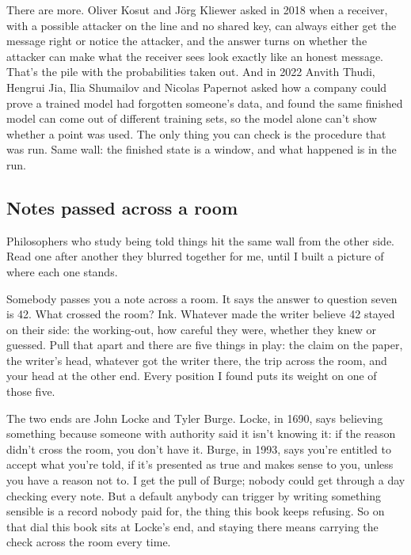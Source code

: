 \documentclass[11pt,twoside]{article}
\theoremstyle{thielethm}
\theoremstyle{thieledef}
\theoremstyle{thieledef}
\theoremstyle{thieledef}
\theoremstyle{thielethm}
\theoremstyle{thieleobs}
\theoremstyle{thielethm}
\begin{document}
There are more. Oliver Kosut and Jörg Kliewer asked in 2018 when a receiver, with a possible attacker on the line and no shared key, can always either get the message right or notice the attacker, and the answer turns on whether the attacker can make what the receiver sees look exactly like an honest message. That's the pile with the probabilities taken out. And in 2022 Anvith Thudi, Hengrui Jia, Ilia Shumailov and Nicolas Papernot asked how a company could prove a trained model had forgotten someone's data, and found the same finished model can come out of different training sets, so the model alone can't show whether a point was used. The only thing you can check is the procedure that was run. Same wall: the finished state is a window, and what happened is in the run.

\subsection{Notes passed across a room}

Philosophers who study being told things hit the same wall from the other side. Read one after another they blurred together for me, until I built a picture of where each one stands.

Somebody passes you a note across a room. It says the answer to question seven is 42. What crossed the room? Ink. Whatever made the writer believe 42 stayed on their side: the working-out, how careful they were, whether they knew or guessed. Pull that apart and there are five things in play: the claim on the paper, the writer's head, whatever got the writer there, the trip across the room, and your head at the other end. Every position I found puts its weight on one of those five.

The two ends are John Locke and Tyler Burge. Locke, in 1690, says believing something because someone with authority said it isn't knowing it: if the reason didn't cross the room, you don't have it. Burge, in 1993, says you're entitled to accept what you're told, if it's presented as true and makes sense to you, unless you have a reason not to. I get the pull of Burge; nobody could get through a day checking every note. But a default anybody can trigger by writing something sensible is a record nobody paid for, the thing this book keeps refusing. So on that dial this book sits at Locke's end, and staying there means carrying the check across the room every time.
\end{document}
